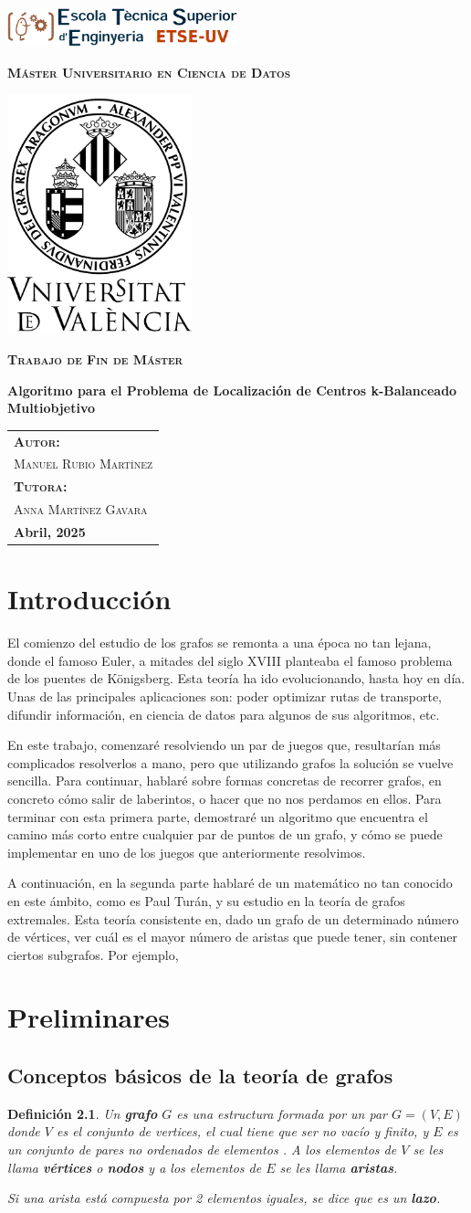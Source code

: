 \documentclass[12pt,a4paper]{book}
\newtheorem{defi}{Definición}[section]
\newcommand{\nuevaportada}[6]{
    \thispagestyle{empty}
    \begin{center}
        \includegraphics[width=0.5\textwidth]{images/logo.png}
        
        \vspace{0.5cm}
        {\Large\bfseries\textsc{M\'aster Universitario en #1}\par}
        
        \vspace{0.5cm}
        \includegraphics[width=0.4\textwidth]{images/uv.png}
        
        \vspace{0.5cm}
        {\Large\bfseries\textsc{Trabajo de Fin de M\'aster}\par}
        
        \vspace{0.5cm}
        {\Large\bfseries #2\par}
        
        \vspace{2cm}
        \begin{flushright}
            \begin{tabular}{l} 
                {\large\bfseries\textsc{Autor:}} \\
                {\large\textsc{#3}} \\ [0.5cm] 
                {\large\bfseries\textsc{Tutora:}} \\ 
                {\large\textsc{#4}} \\ [0.5cm]
                {\large\bfseries #5} 
            \end{tabular}
        \end{flushright}
    \end{center}
    \clearpage
}
\begin{document}
\frontmatter
{}
\nuevaportada{Ciencia de Datos}{Algoritmo para el Problema de Localización de Centros k-Balanceado Multiobjetivo}{Manuel Rubio Martínez}{Anna Martínez Gavara}{Abril, 2025}

\clearpage
\thispagestyle{empty} \mbox{} \clearpage

\newpage
\tableofcontents

\chapter{Introducción}

El comienzo del estudio de los grafos se remonta a una época no tan lejana, donde el famoso Euler, a mitades del siglo XVIII planteaba el famoso problema
de los puentes de Königsberg. Esta teoría ha ido evolucionando, hasta hoy en día. Unas de las principales aplicaciones son: poder optimizar rutas de transporte, difundir información, en ciencia de datos
para algunos de sus algoritmos, etc. 

\smallskip

En este trabajo, comenzaré resolviendo un par de juegos que, resultarían más complicados resolverlos a mano, pero que utilizando grafos la solución se vuelve sencilla. Para continuar, hablaré sobre
formas concretas de recorrer grafos, en concreto cómo salir de laberintos, o hacer que no nos perdamos en ellos. Para terminar con esta primera parte, demostraré un algoritmo que encuentra el camino más corto
entre cualquier par de puntos de un grafo, y cómo se puede implementar en uno de los juegos que anteriormente resolvimos.

\smallskip


A continuación, en la segunda parte hablaré de un matemático no tan conocido en este ámbito, como es Paul Turán, y su estudio en la teoría de grafos extremales. Esta teoría consistente en, dado un grafo de un determinado número de vértices, ver cuál es
el mayor número de aristas que puede tener, sin contener ciertos subgrafos. Por ejemplo, 


\chapter{Preliminares}
\section{Conceptos básicos de la teoría de grafos}

\begin{defi}
Un \textbf{grafo} $G$ es una estructura formada por un par $G=(V,E)$ donde $V$ es el conjunto de vertices, el cual
tiene que ser no vacío y finito, y $E$ es un conjunto de pares no ordenados de elementos . A los elementos
de $V$ se les llama \textbf{vértices} o \textbf{nodos} y a los elementos de $E$ se les llama \textbf{aristas}.

\smallskip

Si una arista está compuesta por 2 elementos iguales, se dice que es un \textbf{lazo}.

\end{defi}
\bigskip
\end{document}
